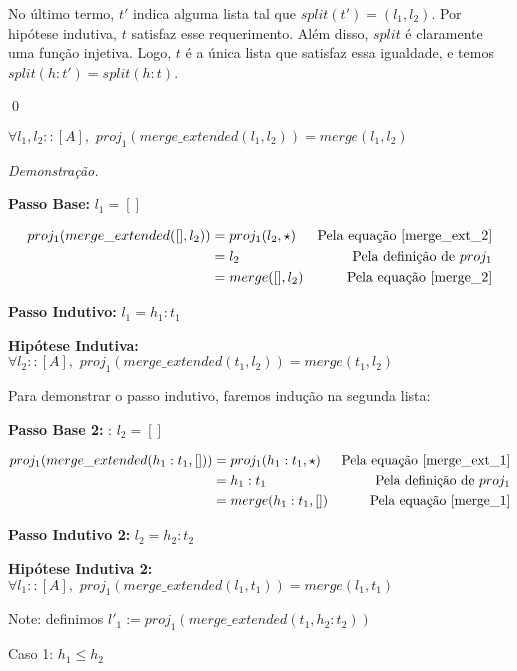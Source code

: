 \documentclass[12pt, oneside, a4paper,english,brazil]{abntex2}
\begin{document}
No \'ultimo termo, $t'$ indica alguma lista tal que $split(t') = (l_{1}, l_{2})$. Por hip\'otese indutiva, $t$ satisfaz esse requerimento. Al\'em disso, $split$ \'e claramente uma fun\c{c}\~ao injetiva. Logo, $t$ \'e a \'unica lista que satisfaz essa igualdade, e temos $split(h : t') = split(h : t)$.

\qed

\begin{teorema}\label{merge_eq}
  $\forall l_{1}, l_{2} :: [A], \,\, proj_1(merge\_extended(l_{1}, l_{2})) = merge(l_{1}, l_{2})$
\end{teorema}

\noindent \textit{Demonstra\c{c}\~ao.}

\textbf{Passo Base: } $l_{1} = []$

\begin{align*}
  proj_{1}(merge\_extended([], l_{2})) &= proj_{1}(l_{2}, \star) &\text{Pela equa\c{c}\~ao \ref{merge_ext_2}} \\
  &= l_{2} &\text{Pela defini\c{c}\~ao de } proj_1\\
  &= merge([], l_{2}) &\text{Pela equa\c{c}\~ao \ref{merge_2}}
\end{align*}

\textbf{Passo Indutivo: } $l_{1} = h_{1} : t_{1}$

\textbf{Hip\'otese Indutiva: } $\forall l_{2} :: [A], \,\, proj_{1}(merge\_extended(t_{1}, l_{2})) = merge(t_{1}, l_{2})$

Para demonstrar o passo indutivo, faremos indu\c{c}\~ao na segunda lista:

\textbf{Passo Base 2: }: $l_{2} = []$

\begin{align*}
  proj_{1}(merge\_extended(h_{1} : t_{1}, [])) &= proj_{1}(h_{1} : t_{1}, \star) &\text{Pela equa\c{c}\~ao \ref{merge_ext_1}} \\
  &= h_{1} : t_{1} &\text{Pela defini\c{c}\~ao de } proj_1 \\
  &= merge(h_{1} : t_{1}, []) &\text{Pela equa\c{c}\~ao \ref{merge_1}}
\end{align*}

\textbf{Passo Indutivo 2: } $l_{2} = h_{2} : t_{2}$

\textbf{Hip\'otese Indutiva 2: } $\forall l_{1} :: [A], \,\, proj_{1}(merge\_extended(l_{1}, t_{1})) = merge(l_{1}, t_{1})$

Note: definimos $l'_{1} := proj_{1}(merge\_extended(t_{1}, h_{2} : t_{2}))$

Caso 1: $h_{1} \le h_{2}$\\
\end{document}
